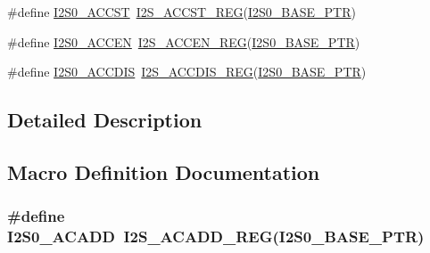\begin{DoxyCompactItemize}
\item 
\#define \hyperlink{group___i2_s___register___accessor___macros_gad248bf834a2fce57b9eb1e90aa261801}{I2\+S0\+\_\+\+A\+C\+C\+ST}~\hyperlink{group___i2_s___register___accessor___macros_ga9777b51f33e4cfa9be8bf796c2ddc6a5}{I2\+S\+\_\+\+A\+C\+C\+S\+T\+\_\+\+R\+EG}(\hyperlink{group___i2_s___peripheral_ga2eac5d85244610150239927c71b2e147}{I2\+S0\+\_\+\+B\+A\+S\+E\+\_\+\+P\+TR})
\item 
\#define \hyperlink{group___i2_s___register___accessor___macros_ga367caa4972990d3a4c0aebe797a406b5}{I2\+S0\+\_\+\+A\+C\+C\+EN}~\hyperlink{group___i2_s___register___accessor___macros_gadbedb1e04883e34b1a73e41b598db377}{I2\+S\+\_\+\+A\+C\+C\+E\+N\+\_\+\+R\+EG}(\hyperlink{group___i2_s___peripheral_ga2eac5d85244610150239927c71b2e147}{I2\+S0\+\_\+\+B\+A\+S\+E\+\_\+\+P\+TR})
\item 
\#define \hyperlink{group___i2_s___register___accessor___macros_ga5f11c0b20979a1e2af8ee912693250c7}{I2\+S0\+\_\+\+A\+C\+C\+D\+IS}~\hyperlink{group___i2_s___register___accessor___macros_ga32149508ca470312dc18188f6b93c17c}{I2\+S\+\_\+\+A\+C\+C\+D\+I\+S\+\_\+\+R\+EG}(\hyperlink{group___i2_s___peripheral_ga2eac5d85244610150239927c71b2e147}{I2\+S0\+\_\+\+B\+A\+S\+E\+\_\+\+P\+TR})
\end{DoxyCompactItemize}


\subsection{Detailed Description}


\subsection{Macro Definition Documentation}
\subsubsection[{\texorpdfstring{I2\+S0\+\_\+\+A\+C\+A\+DD}{I2S0_ACADD}}]{\setlength{\rightskip}{0pt plus 5cm}\#define I2\+S0\+\_\+\+A\+C\+A\+DD~{\bf I2\+S\+\_\+\+A\+C\+A\+D\+D\+\_\+\+R\+EG}({\bf I2\+S0\+\_\+\+B\+A\+S\+E\+\_\+\+P\+TR})}\hypertarget{group___i2_s___register___accessor___macros_gabfb36793497d39eb0297409ee629af52}{}\label{group___i2_s___register___accessor___macros_gabfb36793497d39eb0297409ee629af52}


